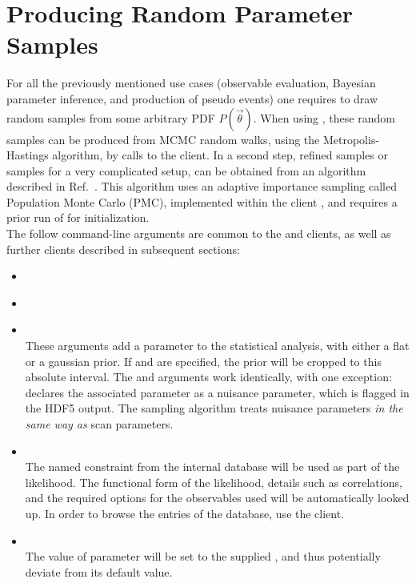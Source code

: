 \section{Producing Random Parameter Samples}
\label{sec:usage:ctg-sample-mcmc+pmc}

For all the previously mentioned use cases (observable evaluation, Bayesian
parameter inference, and production of pseudo events) one requires to draw
random samples from some arbitrary \gls{PDF} $P(\vec\theta)$.  When using \ctg,
these random samples can be produced from \gls{MCMC} random walks, using the
Metropolis-Hastings algorithm, by calls to the  client.
In a second step, refined samples or samples for a very complicated setup, can
be obtained from an algorithm described in Ref.~\cite{Beaujean:2013}. This
algorithm uses an adaptive importance sampling called Population Monte Carlo
(PMC), implemented within the client , and requires a
prior run of  for initialization.\\


The follow command-line arguments are common to the  and
 clients, as well as further clients described in subsequent
sections:
\begin{itemize}
    \item[] \\[-3\medskipamount]
    \item[] \\[-3\medskipamount]
    \item[] \\[\medskipamount]
        These arguments add a parameter to the statistical analysis, with
        either a flat or a gaussian prior. If  and
         are specified, the prior will be cropped to this
        absolute interval.  The  and 
        arguments work identically, with one exception: 
        declares the associated parameter as a nuisance parameter, which is
        flagged in the \gls{HDF5} output. The sampling algorithm treats nuisance
        parameters \emph{in the same way as} scan parameters.

    \item[] \\[\medskipamount]
        The named constraint from the internal database will be used as part of
        the likelihood. The functional form of the likelihood, details such
        as correlations, and the required options for the observables used will
        be automatically looked up. In order to browse the entries of the
        database, use the  client.

    \item[] \\[\medskipamount]
        The value of parameter  will be set to the supplied
        , and thus potentially deviate from its default value.
\end{itemize}

